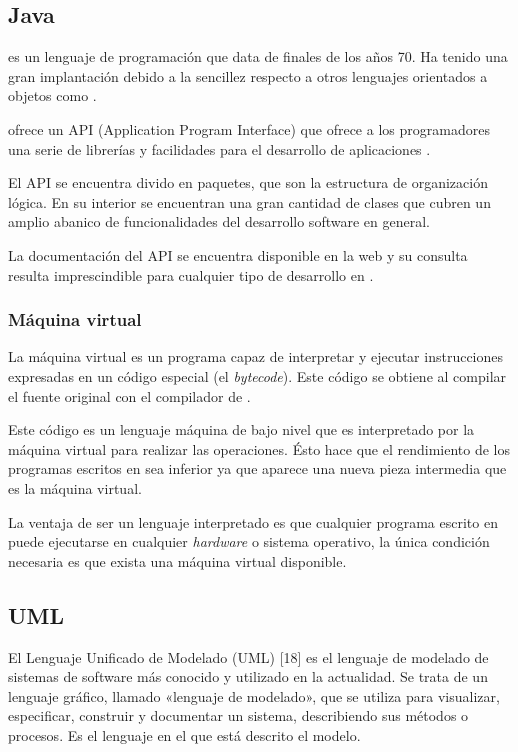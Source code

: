 \subsection{Java}
\java{} es un lenguaje de programación que data de finales de los años 70. Ha tenido una gran implantación debido a la sencillez respecto a otros lenguajes orientados a objetos como \cpp{}.

\java{} ofrece un API (Application Program Interface) que ofrece a los programadores una serie de librerías y facilidades para el desarrollo de aplicaciones \java{}.

El API se encuentra divido en paquetes, que son la estructura de organización lógica. En su interior se encuentran una gran cantidad de clases que cubren un amplio abanico de funcionalidades del desarrollo software en general.

La documentación del API se encuentra disponible en la web y su consulta resulta imprescindible para cualquier tipo de desarrollo en \java{}.

\subsubsection*{Máquina virtual}
La máquina virtual es un programa capaz de interpretar y ejecutar instrucciones expresadas en un código especial (el \java{} \textit{bytecode}). Este código se obtiene al compilar el fuente original con el compilador de \java{}.

Este código es un lenguaje máquina de bajo nivel que es interpretado por la máquina virtual para realizar las operaciones. Ésto hace que el rendimiento de los programas escritos en \java{} sea inferior ya que aparece una nueva pieza intermedia que es la máquina virtual.

La ventaja de ser un lenguaje interpretado es que cualquier programa escrito en \java{} puede ejecutarse en cualquier \textit{hardware} o sistema operativo, la única condición necesaria es que exista una máquina virtual disponible.

\subsection{UML}
El Lenguaje Unificado de Modelado (UML) [18] es el lenguaje de modelado de sistemas de software más conocido y utilizado en la actualidad. Se trata de un lenguaje gráfico, llamado «lenguaje de modelado», que se utiliza para visualizar, especificar, construir y documentar un sistema, describiendo sus métodos o procesos. Es el lenguaje en el que está descrito el modelo.

